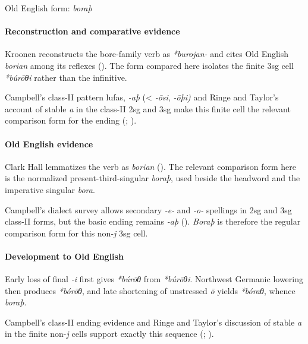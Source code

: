 \documentclass[
  british,
  a4paper,
]{article}
\begin{document}
Old English form: \emph{boraþ}

\paragraph{Reconstruction and comparative
evidence}\label{reconstruction-and-comparative-evidence-60}

Kroonen reconstructs the bore-family verb as \emph{*burojan-} and cites
Old English \emph{borian} among its reflexes
(). The form compared here
isolates the finite 3sg cell \emph{*búrōθi} rather than the infinitive.

Campbell's class-II pattern lufas, \emph{-aþ} (\textless{} \emph{-ōsi},
\emph{-ōþi)} and Ringe and Taylor's account of stable \emph{a} in the
class-II 2sg and 3sg make this finite cell the relevant comparison form
for the ending (;
).

\paragraph{Old English evidence}\label{old-english-evidence-60}

Clark Hall lemmatizes the verb as \emph{borian}
(). The relevant
comparison form here is the normalized present-third-singular
\emph{boraþ}, used beside the headword and the imperative singular
\emph{bora}.

Campbell's dialect survey allows secondary \emph{-e-} and \emph{-o-}
spellings in 2sg and 3sg class-II forms, but the basic ending remains
\emph{-aþ} ().
\emph{Boraþ} is therefore the regular comparison form for this
non-\emph{j} 3sg cell.

\paragraph{Development to Old
English}\label{development-to-old-english-60}

Early loss of final \emph{-i} first gives \emph{*búrōθ} from
\emph{*búrōθi}. Northwest Germanic lowering then produces \emph{*bórōθ},
and late shortening of unstressed \emph{ō} yields \emph{*bóraθ}, whence
\emph{boraþ}.

Campbell's class-II ending evidence and Ringe and Taylor's discussion of
stable \emph{a} in the finite non-\emph{j} cells support exactly this
sequence (;
).
\end{document}
